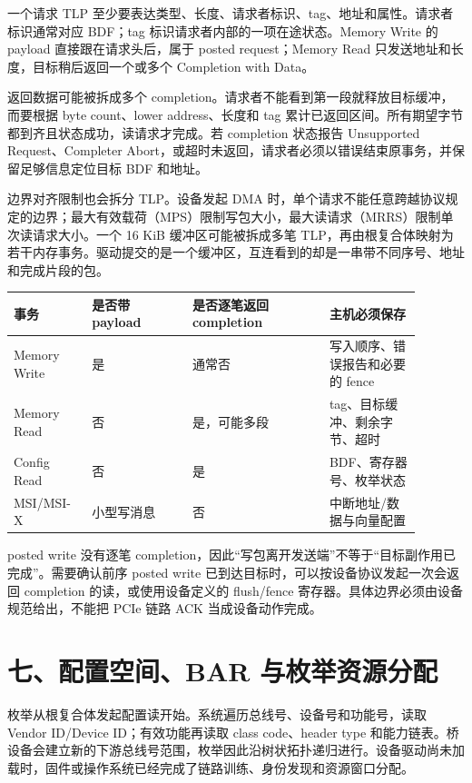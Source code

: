 一个请求 TLP 至少要表达类型、长度、请求者标识、tag、地址和属性。请求者标识通常对应 BDF；tag 标识请求者内部的一项在途状态。Memory Write 的 payload 直接跟在请求头后，属于 posted request；Memory Read 只发送地址和长度，目标稍后返回一个或多个 Completion with Data。

返回数据可能被拆成多个 completion。请求者不能看到第一段就释放目标缓冲，而要根据 byte count、lower address、长度和 tag 累计已返回区间。所有期望字节都到齐且状态成功，读请求才完成。若 completion 状态报告 Unsupported Request、Completer Abort，或超时未返回，请求者必须以错误结束原事务，并保留足够信息定位目标 BDF 和地址。

边界对齐限制也会拆分 TLP。设备发起 DMA 时，单个请求不能任意跨越协议规定的边界；最大有效载荷（MPS）限制写包大小，最大读请求（MRRS）限制单次读请求大小。一个 16 KiB 缓冲区可能被拆成多笔 TLP，再由根复合体映射为若干内存事务。驱动提交的是一个缓冲区，互连看到的却是一串带不同序号、地址和完成片段的包。

\begin{longtable}{L{0.17\linewidth}L{0.22\linewidth}L{0.30\linewidth}L{0.20\linewidth}}
\toprule
事务 & 是否带 payload & 是否逐笔返回 completion & 主机必须保存 \\
\midrule
Memory Write & 是 & 通常否 & 写入顺序、错误报告和必要的 fence \\\tablerowrule
Memory Read & 否 & 是，可能多段 & tag、目标缓冲、剩余字节、超时 \\\tablerowrule
Config Read & 否 & 是 & BDF、寄存器号、枚举状态 \\\tablerowrule
MSI/MSI-X & 小型写消息 & 否 & 中断地址/数据与向量配置 \\
\bottomrule
\end{longtable}

posted write 没有逐笔 completion，因此“写包离开发送端”不等于“目标副作用已完成”。需要确认前序 posted write 已到达目标时，可以按设备协议发起一次会返回 completion 的读，或使用设备定义的 flush/fence 寄存器。具体边界必须由设备规范给出，不能把 PCIe 链路 ACK 当成设备动作完成。

\section{七、配置空间、BAR 与枚举资源分配}

枚举从根复合体发起配置读开始。系统遍历总线号、设备号和功能号，读取 Vendor ID/Device ID；有效功能再读取 class code、header type 和能力链表。桥设备会建立新的下游总线号范围，枚举因此沿树状拓扑递归进行。设备驱动尚未加载时，固件或操作系统已经完成了链路训练、身份发现和资源窗口分配。


